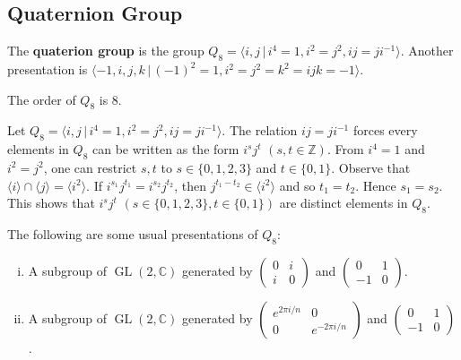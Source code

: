 \subsection{Quaternion Group}
\begin{definition}
	The \textbf{quaterion group} is the group $Q_8 = \langle i,j\,|\, i^4=1, i^2=j^2, ij = ji^{-1}  \rangle$. Another presentation is $\langle -1, i,j,k\,|\, (-1)^2=1, i^2=j^2=k^2 = ijk = -1 \rangle$.
\end{definition}
\begin{proposition}
	The order of $Q_8$ is $8$.
\end{proposition}
\begin{sketch}
	Let $Q_8 = \langle i,j\,|\, i^4=1, i^2=j^2, ij = ji^{-1}  \rangle$. The relation $ij = ji^{-1}$ forces every elements in $Q_8$ can be written as the form $i^sj^t$ $(s,t\in\mathbb{Z})$. From   $i^4=1$ and  $i^2=j^2$, one can restrict $s,t$ to  $s \in\{0,1,2,3\}$ and $t\in \{0,1\}$. Observe that $\langle i \rangle \cap \langle j \rangle = \langle i^2\rangle$. If $i^{s_1}j^{t_1} = i^{s_2}j^{t_2}$, then $j^{t_1-t_2}\in \langle i^2\rangle$ and so $t_1=t_2$. Hence $s_1=s_2$. This shows that $i^sj^t$ $(s \in\{0,1,2,3\},t\in \{0,1\})$ are distinct elements in $Q_8$.
\end{sketch}
The following are some usual presentations of $Q_8$: 
\begin{enumerate}[(i)]
	\item A subgroup of $\operatorname{GL}(2,\mathbb{C})$ generated by $\begin{pmatrix}
		0 & i\\
		i & 0
	\end{pmatrix}$ and $\begin{pmatrix}
	0 & 1\\
	-1 & 0
	\end{pmatrix}$.
	\item A subgroup of $\operatorname{GL}(2,\mathbb{C})$ generated by $\begin{pmatrix}
		e^{2\pi i/n} & 0
		\\
		0 & e^{-2\pi i/n}
	\end{pmatrix}$ and $\begin{pmatrix}
		0 & 1 \\
		-1 & 0
	\end{pmatrix}$.
\end{enumerate}

